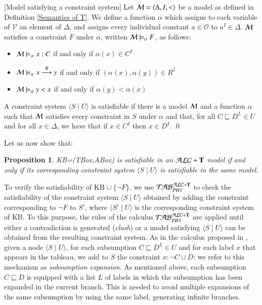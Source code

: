 \documentclass[a4paper, 11pt, oneside]{elsarticle}
\newcommand{\tip}{{\bf T}}
\newcommand{\alct}{\mathcal{ALC}+\tip}
\newcommand{\unione} {\cup}
\newcommand{\unioneq}{\sqcup}
\newcommand{\nott} {\lnot}
\newcommand{\tc} {\mid}
\newcommand{\sx} {\langle}
\newcommand{\dx} {\rangle}
\newcommand{\emme} {\begin{mathcal}M\end{mathcal}}
\newcommand{\primo}{\mathrel{{\mathcal{T}\!\mathcal{AB}}}_{PH 1}^{\mathcal{ALC}+\mbox{\scriptsize $\tip$}}}
\newcommand{\trans}[1]{\stackrel{#1}{\longrightarrow}}
\newenvironment{definition}
{\begin{defi} \rm}{\qed \end{defi}}
\newtheorem{proposition}{Proposition}
\newcounter{posu}
\newtheorem{proposition}[posu]{Proposition}
\newtheorem{definition}[posu]{Definition}
\begin{document}
\begin{definition}[Model satisfying a constraint system]\label{modello constraint}
  Let $\emme=\sx \Delta, I, < \dx$ be a model as defined in Definition \ref{Semantics of T}. We define a function $\alpha$
  which assigns to each variable of $\mathcal{V}$ an element of $\Delta$, and assigns every
  individual constant $a \in \mathcal{O}$ to $a^{I} \in \Delta$. $\emme$ satisfies  a constraint $F$ under $\alpha$,
  written $\emme \models_\alpha F$, as follows:

  \begin{itemize}
    \item $\emme \models_\alpha x: C$  if and only if $\alpha(x) \in C^{I}$
    \item $\emme \models_\alpha x \trans{R} y$ if and only if $(\alpha(x),\alpha(y)) \in R^{I}$
    \item $\emme \models_\alpha y < x$ if and only if $\alpha(y) < \alpha(x)$
  \end{itemize}

  A constraint system $\sx S \tc U \dx$ is satisfiable if there is a model $\emme$ and a function $\alpha$ such that
   $\emme$ satisfies  every constraint in $S$ under $\alpha$ and that, for all $C \sqsubseteq D^L \in U$ and for all $x \in \Delta$,
   we have that if $x \in C^I$ then $x \in D^I$.
\end{definition}

Let us now show that:

\begin{proposition}\label{corresp constr system}
 KB=(TBox,ABox) is satisfiable in an $\alct$ model if
and only if its corresponding constraint system $\sx S \tc U \dx$
is satisfiable in the same model.
\end{proposition}



\noindent To verify the satisfiability of KB $\unione \ \{ \nott F\}$, we use $\primo$ to check the satisfiability of the constraint system $\sx S \tc U \dx$ obtained
by adding the constraint corresponding to $\nott F$ to $S'$, where $\sx S' \tc U \dx$ is the corresponding constraint system of KB. To this purpose, the rules of the calculus
$\primo$ are applied until either a contradiction is generated \color{black}
(\emph{clash}) \normalcolor or a model satisfying $\sx S \tc U \dx$ can be obtained
from the resulting constraint system.
As in the calculus proposed in \cite{FI09}, given a node $\sx S \tc U \dx$, for each subsumption
$C \sqsubseteq D^L \in U$ and for each label $x$ that appears in
the tableau, we add to $S$ the constraint $x: \nott C \unioneq D$: we refer to this mechanism as \color{black} \emph{subsumption expansion}.
As mentioned above, each subsumption $C \sqsubseteq D$ is equipped
with a list $L$ of labels in which the subsumption has been expanded in the
current branch. This is needed to avoid multiple expansions of the
same subsumption by using the same label, generating
infinite branches.
\normalcolor
\end{document}
